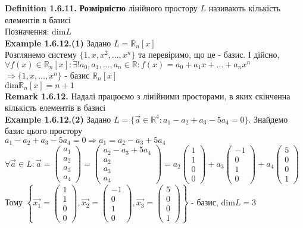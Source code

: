 \documentclass[a4paper, 14pt]{extarticle}
\def\defin#1{\textbf{Definition {#1}}}
\def\ex#1{\textbf{Example {#1}}}
\def\rm#1{\textbf{Remark {#1}}}
\def\bigline{\vspace{5mm}\\}
\def\dim#1{\textrm{dim} {#1}}
\begin{document}
	\defin{1.6.11.} \textbf{Розмірністю} лінійного простору $L$ називають кількість елементів в базисі\\
	Позначення: $\textrm{dim} L$
	\bigline
	\ex{1.6.12.(1)} Задано $L = \mathbb{R}_n[x]$\\
	Розглянемо систему $\{1, x, x^2, \dots, x^n\}$ та перевіримо, що це - базис. І дійсно,\\
	$\forall f(x) \in \mathbb{R}_n[x]: \exists! a_0, a_1, \dots, a_n \in \mathbb{R}: f(x) = a_0 + a_1 x + \dots + a_n x^n$\\
	$\Rightarrow \{1, x, \dots, x^n\}$ - базис $\mathbb{R}_n[x]$ \\ $\dim{\mathbb{R}_n[x]} = n+1$
	\bigline
	\rm{1.6.12.} Надалі працюємо з лінійними просторами, в яких скінченна кількість елементів в базисі
	\bigline
	\ex{1.6.12.(2)} Задано $L = \{\vec{a} \in \mathbb{R}^4: a_1 - a_2 + a_3 - 5a_4 = 0\}$. Знайдемо базис цього простору\\
	$a_1 - a_2 + a_3 - 5a_4 = 0 \Rightarrow a_1 = a_2 - a_3 + 5a_4$\\
	$\forall \vec{a} \in L: \vec{a} = \begin{pmatrix} a_1 \\ a_2 \\ a_3 \\ a_4 \end{pmatrix} = \begin{pmatrix} a_2 - a_3 + 5a_4 \\ a_2 \\ a_3 \\ a_4 \end{pmatrix} = a_2 \begin{pmatrix} 1 \\ 1 \\ 0 \\ 0\end{pmatrix} + a_3 \begin{pmatrix} -1 \\ 0 \\ 1 \\ 0\end{pmatrix} + a_4 \begin{pmatrix} 5 \\ 0 \\ 0 \\ 1 \end{pmatrix}$\\
	Тому $\left\{\vec{x_1} = \begin{pmatrix} 1 \\ 1 \\ 0 \\ 0\end{pmatrix}, \vec{x_2} = \begin{pmatrix} -1 \\ 0 \\ 1 \\ 0\end{pmatrix}, \vec{x_3} = \begin{pmatrix} 5 \\ 0 \\ 0 \\ 1\end{pmatrix} \right\}$ - базис, $\dim{L} = 3$
\end{document}
